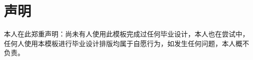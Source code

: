 \chapter*{声明}\thispagestyle{empty}
\textsf{本人在此郑重声明：尚未有人使用此模板完成过任何毕业设计，本人也在尝试中，任何人使用本模板进行毕业设计排版均属于自愿行为，如发生任何问题，本人概不负责。}
